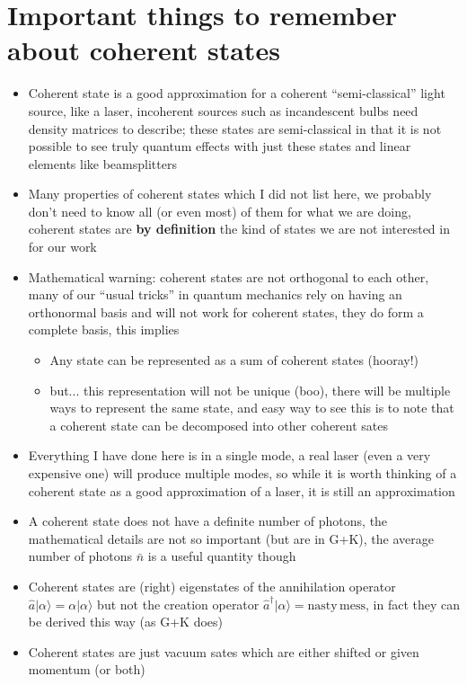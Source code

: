 \documentclass[english]{article}
\newcommand{\ket}[1]{|#1 \rangle}
\begin{document}
\section{Important things to remember about coherent states}

\begin{itemize}
\item Coherent state is a good approximation for a coherent ``semi-classical'' light source, like a laser, incoherent sources such as incandescent bulbs need density matrices to describe; these states are semi-classical in that it is not possible to see truly quantum effects with just these states and linear elements like beamsplitters
\item Many properties of coherent states which I did not list here, we probably don't need to know all (or even most) of them for what we are doing, coherent states are \textbf{by definition} the kind of states we are not interested in for our work
\item Mathematical warning: coherent states are not orthogonal to each other, many of our ``usual tricks'' in quantum mechanics rely on having an orthonormal basis and will not work for coherent states, they do form a complete basis, this implies
\begin{itemize}
\item Any state can be represented as a sum of coherent states (hooray!)
\item but... this representation will not be unique (boo), there will be multiple ways to represent the same state, and easy way to see this is to note that a coherent state can be decomposed into other coherent sates
\end{itemize}
\item Everything I have done here is in a single mode, a real laser (even a very expensive one) will produce multiple modes, so while it is worth thinking of a coherent state as a good approximation of a laser, it is still an approximation
\item A coherent state does not have a definite number of photons, the mathematical details are not so important (but are in G+K), the average number of photons $\bar{n}$ is a useful quantity though
\item Coherent states are (right) eigenstates of the annihilation operator $\hat{a}\ket{\alpha}=\alpha \ket{\alpha}$ but not the creation operator $\hat{a}^\dagger\ket{\alpha}=\mathrm{nasty\,mess}$, in fact they can be derived this way (as G+K does)
\item Coherent states are just vacuum sates which are either shifted or given momentum (or both)
\end{itemize}
\end{document}
